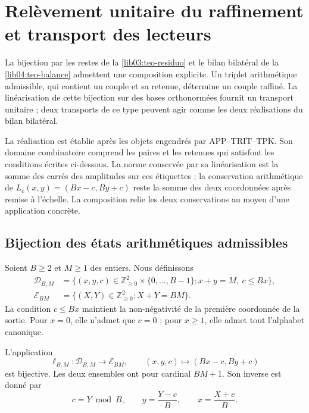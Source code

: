 \section{Relèvement unitaire du raffinement et transport des lecteurs}
\label{lib05:levantamiento}

La bijection par les restes de la \cref{lib03:teo-residuo} et le
bilan bilatéral de la \cref{lib04:teo-balance} admettent une
composition explicite. Un triplet arithmétique admissible, qui contient
un couple et sa retenue, détermine un couple raffiné. La
linéarisation de cette bijection sur des bases orthonormées fournit
un transport unitaire ; deux transports de ce type peuvent agir
comme les deux réalisations du bilan bilatéral.

La réalisation est établie après les objets engendrés par APP--TRIT--TPK. Son domaine combinatoire comprend les paires et les retenues qui satisfont les conditions écrites ci-dessous. La norme conservée par sa linéarisation est la somme des carrés des amplitudes sur ces étiquettes ; la conservation arithmétique de \(L_c(x,y)=(Bx-c,By+c)\) reste la somme des deux coordonnées après remise à l'échelle. La composition relie les deux conservations au moyen d'une application concrète.

\subsection{Bijection des états arithmétiques admissibles}
\label{lib05:biyeccion}

Soient \(B\geq2\) et \(M\geq1\) des entiers. Nous définissons
\begin{align}
 \mathcal D_{B,M}
 &=\bigl\{(x,y,c)\in\mathbb Z_{\geq0}^2
                 \times\{0,\ldots,B-1\}:x+y=M,\ c\leq Bx\bigr\},
 \label{lib05:dominio}\\
 \mathcal E_{BM}
 &=\bigl\{(X,Y)\in\mathbb Z_{\geq0}^2:X+Y=BM\bigr\}.
 \label{lib05:codominio}
\end{align}
La condition \(c\leq Bx\) maintient la non-négativité de la
première coordonnée de la sortie. Pour \(x=0\), elle n’admet que
\(c=0\) ; pour \(x\geq1\), elle admet tout l’alphabet canonique.

\begin{theorem}
\label{lib05:teo-biyeccion}
L'application
\begin{equation}
 \ell_{B,M}:\mathcal D_{B,M}\longrightarrow\mathcal E_{BM},
 \qquad (x,y,c)\longmapsto(Bx-c,By+c)
 \label{lib05:mapa-etiquetas}
\end{equation}
est bijective. Les deux ensembles ont pour cardinal \(BM+1\). Son inverse
est donné par
\begin{equation}
 c=Y\bmod B,\qquad y=\frac{Y-c}{B},\qquad x=\frac{X+c}{B}.
 \label{lib05:inversa-etiquetas}
\end{equation}
\end{theorem}


